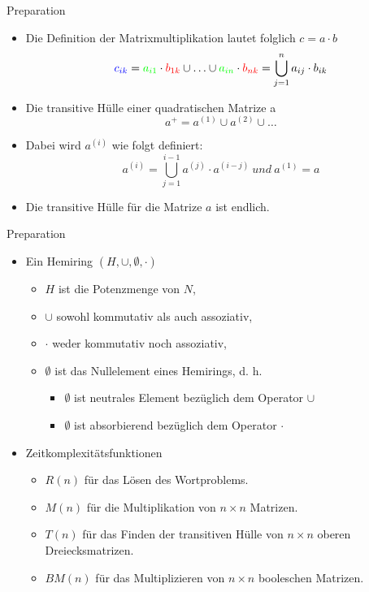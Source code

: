 \documentclass{beamer}
\begin{document}
	\begin{frame}{Preparation}
		\begin{itemize}
			\item Die Definition der Matrixmultiplikation lautet folglich $c = a \cdot b$
			$$\textcolor{blue}{c_{ik}} = \textcolor{green}{a_{i1}} \cdot \textcolor{red}{b_{1k}} \cup \ldots \cup \textcolor{green}{a_{in}} \cdot \textcolor{red}{b_{nk}} =  \bigcup_{j=1}^{n} a_{ij} \cdot b_{ik}$$
			\item Die transitive Hülle einer quadratischen Matrize a
			$$a^+ = a^{(1)} \cup a^{(2)} \cup \ldots$$
			\pause
			\item Dabei wird $a^{(i)}$ wie folgt definiert:
			$$a^{(i)} = \bigcup_{j=1}^{i-1} a^{(j)} \cdot a^{(i-j)} \  und \ a^{(1)} = a$$
			\item Die transitive Hülle für die Matrize $a$ ist endlich.
		\end{itemize}

	\end{frame}

	\begin{frame}{Preparation}
		\begin{itemize}
			\item Ein Hemiring $(H, \cup, \emptyset,\cdot)$
			\begin{itemize}
				\item $H$ ist die Potenzmenge von $N$,
				\item $\cup$ sowohl kommutativ als auch assoziativ,
				\item $\cdot$ weder kommutativ noch assoziativ,
				\item $\emptyset$ ist das Nullelement eines Hemirings, d. h.
				\begin{itemize}
					\item $\emptyset$ ist neutrales Element bezüglich dem Operator $\cup$
					\item $\emptyset$ ist absorbierend bezüglich dem Operator $\cdot$
				\end{itemize}
			\end{itemize}
			\pause
			\item Zeitkomplexitätsfunktionen
			\begin{itemize}
				\item $R(n)$ für das Lösen des Wortproblems.
				\item $M(n)$ für die Multiplikation von $n\times n$ Matrizen.
				\item $T(n)$ für das Finden der transitiven Hülle von $n  \times n$ oberen Dreiecksmatrizen.
				\item $BM(n)$ für das Multiplizieren von $n \times n$ booleschen Matrizen. 
			\end{itemize}
		\end{itemize}
	\end{frame}
\end{document}
